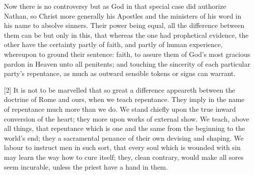Now there is no controversy but as God in that special case did authorize Nathan, so Christ more generally his Apostles and the ministers of his word in his name to absolve sinners. Their power being equal, all the difference between them can be but only in this, that whereas the one had prophetical evidence, the other have the certainty partly of faith, and partly of human experience, whereupon to ground their sentence: faith, to assure them of God’s most gracious pardon in Heaven unto all penitents; and touching the sincerity of each particular party’s repentance, as much as outward sensible tokens or signs can warrant.

[2] It is not to be marvelled that so great a difference appeareth between the doctrine of Rome and ours, when we teach repentance. They imply in the name of repentance much more than we do. We stand chiefly upon the true inward conversion of the heart; they more upon works of external show. We teach, above all things, that repentance which is one and the same from the beginning to the world’s  end; they a sacramental penance of their own devising and shaping. We labour to instruct men in such sort, that every soul which is wounded with sin may learn the way how to cure itself; they, clean contrary, would make all sores seem incurable, unless the priest have a hand in them.

